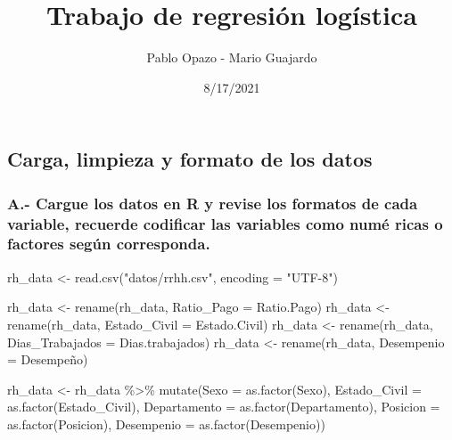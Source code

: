 \documentclass[
]{article}
\title{Trabajo de regresión logística}
\author{Pablo Opazo - Mario Guajardo}
\date{8/17/2021}
\newenvironment{Shaded}{\begin{snugshade}}{\end{snugshade}}
\newcommand{\AttributeTok}[1]{\textcolor[rgb]{0.77,0.63,0.00}{#1}}
\newcommand{\FunctionTok}[1]{\textcolor[rgb]{0.00,0.00,0.00}{#1}}
\newcommand{\NormalTok}[1]{#1}
\newcommand{\OtherTok}[1]{\textcolor[rgb]{0.56,0.35,0.01}{#1}}
\newcommand{\SpecialCharTok}[1]{\textcolor[rgb]{0.00,0.00,0.00}{#1}}
\newcommand{\StringTok}[1]{\textcolor[rgb]{0.31,0.60,0.02}{#1}}
\begin{document}
\maketitle

\hypertarget{carga-limpieza-y-formato-de-los-datos}{%
\subsection{Carga, limpieza y formato de los
datos}\label{carga-limpieza-y-formato-de-los-datos}}

\hypertarget{a.--cargue-los-datos-en-r-y-revise-los-formatos-de-cada-variable-recuerde-codificar-las-variables-como-numuxe9-ricas-o-factores-seguxfan-corresponda.}{%
\subsubsection{A.- Cargue los datos en R y revise los formatos de cada
variable, recuerde codificar las variables como numé ricas o factores
según
corresponda.}\label{a.--cargue-los-datos-en-r-y-revise-los-formatos-de-cada-variable-recuerde-codificar-las-variables-como-numuxe9-ricas-o-factores-seguxfan-corresponda.}}

\begin{Shaded}
\begin{Highlighting}[]
\NormalTok{rh\_data }\OtherTok{\textless{}{-}} \FunctionTok{read.csv}\NormalTok{(}\StringTok{"datos/rrhh.csv"}\NormalTok{, }\AttributeTok{encoding =} \StringTok{"UTF{-}8"}\NormalTok{)}

\NormalTok{rh\_data }\OtherTok{\textless{}{-}} \FunctionTok{rename}\NormalTok{(rh\_data, }\AttributeTok{Ratio\_Pago =}\NormalTok{ Ratio.Pago)}
\NormalTok{rh\_data }\OtherTok{\textless{}{-}} \FunctionTok{rename}\NormalTok{(rh\_data, }\AttributeTok{Estado\_Civil =}\NormalTok{ Estado.Civil)}
\NormalTok{rh\_data }\OtherTok{\textless{}{-}} \FunctionTok{rename}\NormalTok{(rh\_data, }\AttributeTok{Dias\_Trabajados =}\NormalTok{ Dias.trabajados)}
\NormalTok{rh\_data }\OtherTok{\textless{}{-}} \FunctionTok{rename}\NormalTok{(rh\_data, }\AttributeTok{Desempenio =}\NormalTok{ Desempeño)}


\NormalTok{rh\_data }\OtherTok{\textless{}{-}}\NormalTok{ rh\_data }\SpecialCharTok{\%\textgreater{}\%} \FunctionTok{mutate}\NormalTok{(}\AttributeTok{Sexo =} \FunctionTok{as.factor}\NormalTok{(Sexo),}
                              \AttributeTok{Estado\_Civil =} \FunctionTok{as.factor}\NormalTok{(Estado\_Civil),}
                              \AttributeTok{Departamento =} \FunctionTok{as.factor}\NormalTok{(Departamento),}
                              \AttributeTok{Posicion =} \FunctionTok{as.factor}\NormalTok{(Posicion),}
                              \AttributeTok{Desempenio =} \FunctionTok{as.factor}\NormalTok{(Desempenio))}
\end{Highlighting}
\end{Shaded}
\end{document}
